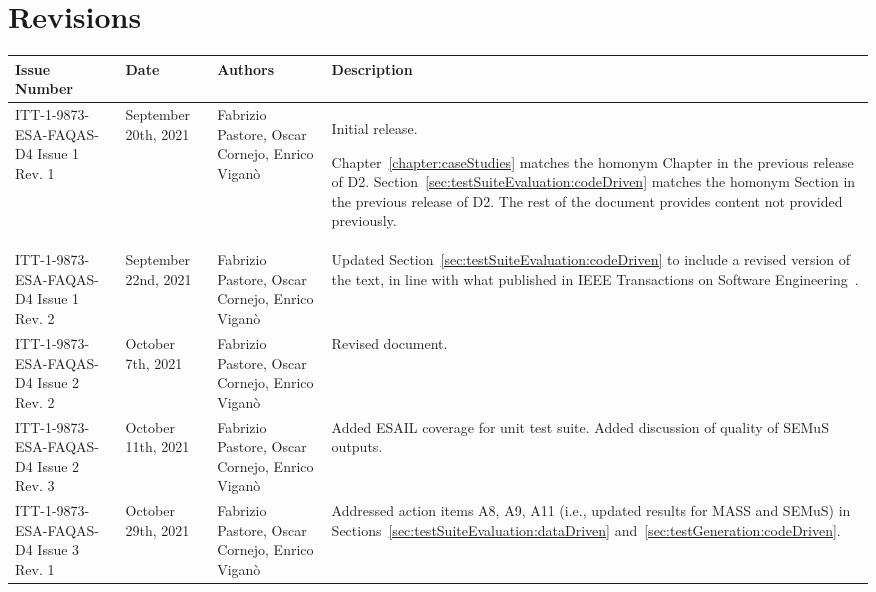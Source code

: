 
\section*{Revisions}
\label{sec:revisions}


\setlength\LTleft{0pt}
\setlength\LTright{0pt}
\tiny 
\begin{longtable}{|p{2cm}|p{1cm}|p{1.5cm}|p{9cm}|@{}}
\label{table:codeoperators} \\
\hline
\textbf{Issue Number}&\textbf{Date}&\textbf{Authors}&\textbf{Description}\\
\hline
ITT-1-9873-ESA-FAQAS-D4
Issue 1 Rev. 1&
September 20th, 2021&
Fabrizio Pastore, Oscar Cornejo, Enrico Viganò&
\begin{minipage}{8cm}
Initial release.

Chapter~\ref{chapter:caseStudies} matches the homonym Chapter in the previous release of D2.
Section~\ref{sec:testSuiteEvaluation:codeDriven} matches the homonym Section in the previous release of D2.
The rest of the document provides content not provided previously.
\end{minipage}
\\
\hline
ITT-1-9873-ESA-FAQAS-D4
Issue 1 Rev. 2&
September 22nd, 2021&
Fabrizio Pastore, Oscar Cornejo, Enrico Viganò&
\begin{minipage}{8cm}
Updated Section~\ref{sec:testSuiteEvaluation:codeDriven} to include a revised version of the text, in line with what published in IEEE Transactions on Software Engineering~\cite{Oscar:TSE}.
\end{minipage}
\\
\hline
ITT-1-9873-ESA-FAQAS-D4
Issue 2 Rev. 2&
October 7th, 2021&
Fabrizio Pastore, Oscar Cornejo, Enrico Viganò&
\begin{minipage}{8cm}
Revised document.
\end{minipage}
\\
\hline

ITT-1-9873-ESA-FAQAS-D4
Issue 2 Rev. 3&
October 11th, 2021&
Fabrizio Pastore, Oscar Cornejo, Enrico Viganò&
\begin{minipage}{8cm}
Added ESAIL coverage for unit test suite. Added discussion of quality of SEMuS outputs.
\end{minipage}
\\
\hline

ITT-1-9873-ESA-FAQAS-D4
Issue 3 Rev. 1&
October 29th, 2021&
Fabrizio Pastore, Oscar Cornejo, Enrico Viganò&
\begin{minipage}{8cm}
Addressed action items A8, A9, A11 (i.e., updated results for MASS and SEMuS) in Sections~\ref{sec:testSuiteEvaluation:dataDriven} and~\ref{sec:testGeneration:codeDriven}.
\end{minipage}
\\
\hline
                                                    
\end{longtable}
\normalsize

\clearpage